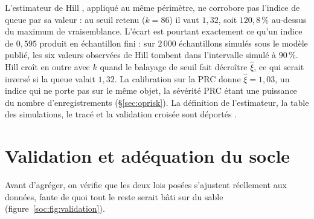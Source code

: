 
L'estimateur de Hill \citep{Hill1975}, appliqué au même périmètre, ne corrobore pas l'indice de
queue par sa valeur : au seuil retenu ($k=86$) il vaut $1{,}32$, soit $120{,}8\,\%$ au-dessus du
maximum de vraisemblance. L'écart est pourtant exactement ce qu'un indice de $0{,}595$ produit en
échantillon fini : sur $2\,000$ échantillons simulés sous le modèle publié, les six valeurs
observées de Hill tombent dans l'intervalle simulé à $90\,\%$. Hill croît en outre avec $k$ quand
le balayage de seuil fait décroître $\hat\xi$, ce qui serait inversé si la queue valait $1{,}32$.
La calibration sur la PRC donne $\hat\xi = 1{,}03$, un indice qui ne porte pas sur le même
objet, la sévérité PRC étant une puissance du nombre d'enregistrements (\S\ref{sec:oprisk}). La
définition de l'estimateur, la table des simulations, le tracé et la validation croisée sont
déportés \matcomp.

\section{Validation et adéquation du socle}
\label{soc:sec:validation}

Avant d'agréger, on vérifie que les deux lois posées s'ajustent réellement aux données, faute
de quoi tout le reste serait bâti sur du sable (figure~\ref{soc:fig:validation}).

